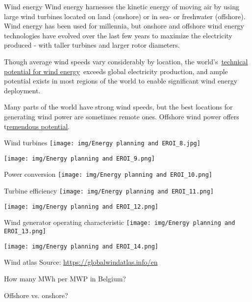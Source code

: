 \begin{frame}{Wind energy}
\label{wind-energy}
Wind energy harnesses the kinetic energy of moving air by using large
wind turbines located on land (onshore) or in sea- or freshwater
(offshore). Wind energy has been used for millennia, but onshore and
offshore wind energy technologies have evolved over the last few years
to maximize the electricity produced - with taller turbines and larger
rotor diameters.

Though average wind speeds vary considerably by location, the
world's~\href{https://www.ipcc.ch/site/assets/uploads/2018/03/Chapter-7-Wind-Energy-1.pdf}{technical
potential for wind energy}~exceeds global electricity production, and
ample potential exists in most regions of the world to enable
significant wind energy deployment.

Many parts of the world have strong wind speeds, but the best locations
for generating wind power are sometimes remote ones. Offshore wind power
offers t\href{https://www.irena.org/wind}{remendous potential}.
\end{frame}

\begin{frame}{Wind turbines}
\label{wind-turbines}
\texttt{[image: img/Energy planning and EROI\_8.jpg]}

\texttt{[image: img/Energy planning and EROI\_9.png]}
\end{frame}

\begin{frame}{Power conversion}
\label{power-conversion}
\texttt{[image: img/Energy planning and EROI\_10.png]}
\end{frame}

\begin{frame}{Turbine efficiency}
\label{turbine-efficiency}
\texttt{[image: img/Energy planning and EROI\_11.png]}

\texttt{[image: img/Energy planning and EROI\_12.png]}
\end{frame}

\begin{frame}{Wind generator operating characteristic}
\label{wind-generator-operating-characteristic}
\texttt{[image: img/Energy planning and EROI\_13.png]}

\texttt{[image: img/Energy planning and EROI\_14.png]}
\end{frame}

\begin{frame}{Wind atlas}
\label{wind-atlas}
Source: \url{https://globalwindatlas.info/en}

How many MWh per MWP in Belgium?

Offshore vs. onshore?
\end{frame}


